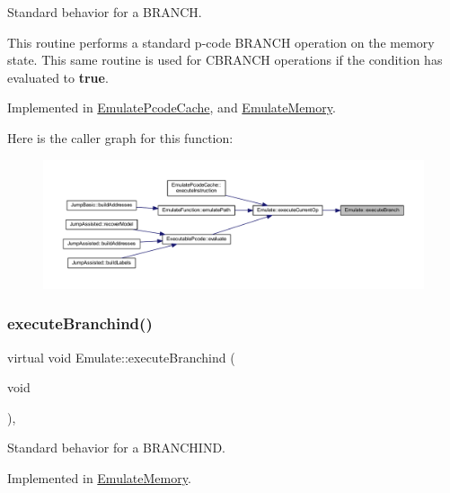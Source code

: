 Standard behavior for a B\+R\+A\+N\+CH. 

This routine performs a standard p-\/code B\+R\+A\+N\+CH operation on the memory state. This same routine is used for C\+B\+R\+A\+N\+CH operations if the condition has evaluated to {\bfseries{true}}. 

Implemented in \mbox{\hyperlink{class_emulate_pcode_cache_a6108efef1c0291ca887228781e4c1238}{Emulate\+Pcode\+Cache}}, and \mbox{\hyperlink{class_emulate_memory_ac69d1f93ffc1a86d3486af34bb520302}{Emulate\+Memory}}.

Here is the caller graph for this function\+:
\nopagebreak
\begin{figure}[H]
\begin{center}
\leavevmode
\includegraphics[width=350pt]{class_emulate_a145cee350a9273250a970c9387ecbd81_icgraph}
\end{center}
\end{figure}
\mbox{\label{class_emulate_a9b2a5e6e6328d22c6143a5ca7d3ce4e4}} 
\subsubsection{\texorpdfstring{executeBranchind()}{executeBranchind()}}
{\footnotesize\ttfamily virtual void Emulate\+::execute\+Branchind (\begin{DoxyParamCaption}\item[{void}]{ }\end{DoxyParamCaption})\hspace{0.3cm}{\ttfamily [protected]}, {}}



Standard behavior for a B\+R\+A\+N\+C\+H\+I\+ND. 



Implemented in \mbox{\hyperlink{class_emulate_memory_a64cee14cda2a10ed440fe171b8fdbcc0}{Emulate\+Memory}}.

